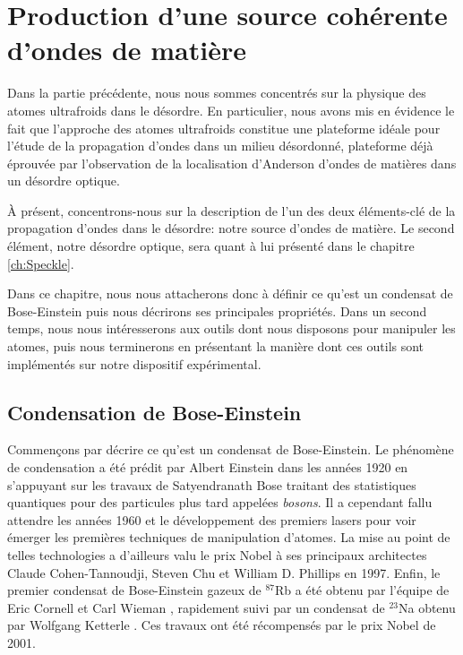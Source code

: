 \chapter{Production d'une source cohérente d'ondes de matière}
\label{ch:BEC_manip}

Dans la partie précédente, nous nous sommes concentrés sur la physique des atomes ultrafroids dans le désordre. En particulier, nous avons mis en évidence le fait que l'approche des atomes ultrafroids constitue une plateforme idéale pour l'étude de la propagation d'ondes dans un milieu désordonné, plateforme déjà éprouvée par l'observation de la localisation d'Anderson d'ondes de matières dans un désordre optique. 

À présent, concentrons-nous sur la description de l'un des deux éléments-clé de la propagation d'ondes dans le désordre: notre source d'ondes de matière. Le second élément, notre désordre optique, sera quant à lui présenté dans le chapitre \ref{ch:Speckle}.

Dans ce chapitre, nous nous attacherons donc à définir ce qu'est un condensat de Bose-Einstein puis nous décrirons ses principales propriétés. Dans un second temps, nous nous intéresserons aux outils dont nous disposons pour manipuler les atomes, puis nous terminerons en présentant la manière dont ces outils sont implémentés sur notre dispositif expérimental. 

\section{Condensation de Bose-Einstein}
Commençons par décrire ce qu'est un condensat de Bose-Einstein. Le phénomène de condensation a été prédit par Albert Einstein dans les années 1920 en s'appuyant sur les travaux de Satyendranath Bose traitant des statistiques quantiques pour des particules plus tard appelées \emph{bosons}. Il a cependant fallu attendre les années 1960 et le développement des premiers lasers pour voir émerger les premières techniques de manipulation d'atomes. La mise au point de telles technologies a d'ailleurs valu le prix Nobel à ses principaux architectes Claude Cohen-Tannoudji, Steven Chu et William D. Phillips en 1997. Enfin, le premier condensat de Bose-Einstein gazeux de ${}^{87}$Rb a été obtenu par l'équipe de Eric Cornell et Carl Wieman \citep{anderson1995observation}, rapidement suivi par un condensat de ${}^{23}$Na obtenu par Wolfgang Ketterle \citep{davis1995bose}. Ces travaux ont été récompensés par le prix Nobel de 2001.

